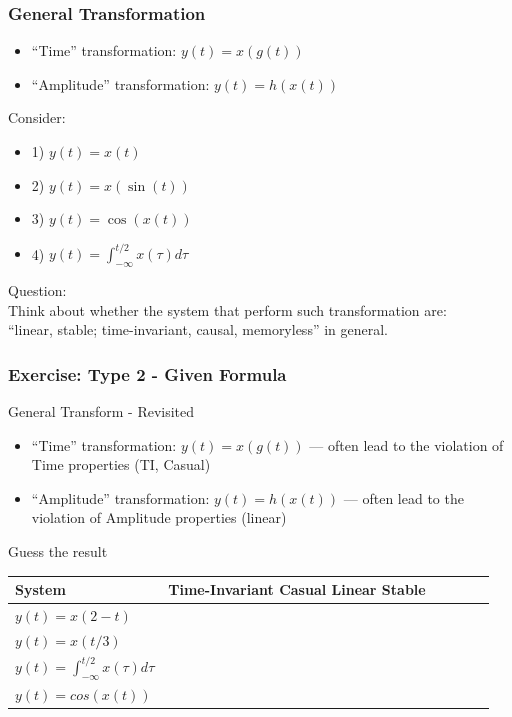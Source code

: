 \documentclass{beamer}
\begin{document}
\begin{frame}
    \frametitle{General Transformation}
    \begin{itemize}
    \item ``Time'' transformation: $ y(t) = x(g(t)) $ \\
    \item ``Amplitude'' transformation: $ y(t) = h(x(t)) $ \\
    \end{itemize}
Consider:
    \begin{itemize}
    \item 1) $y(t) = x(t) $
    \item  2) $y(t) = x(\sin(t))$   
    \item  3) $y(t) = \cos(x(t))$ 
    \item 4) $y(t)=\int_{-\infty}^{t/2}x(\tau)d\tau$               
    \end{itemize}
Question: \\
    \quad Think about whether the system that perform such transformation are: \\
    \quad ``linear, stable; time-invariant, causal, memoryless'' in general.  \\

\end{frame}



\begin{frame}
\frametitle{Exercise: Type 2 - Given Formula}
General Transform - Revisited
\begin{itemize}
    \item ``Time'' transformation: $ y(t) = x(g(t)) $ \newline --- often lead to the violation of Time properties (TI, Casual)\\
    \item ``Amplitude'' transformation: $ y(t) = h(x(t)) $ 
    \newline --- often lead to the violation of Amplitude properties (linear)\\
    \end{itemize}
\begin{block}{Guess the result}

\begin{table}
\begin{tabular}{l l l l l l }
\toprule
\textbf{System} & \textbf{Time-Invariant Casual Linear Stable} \\
\midrule
$y(t) = x(2 - t)$ & \\
$y(t) = x(t/3)$ & \\
$y(t) = \int_{-\infty}^{t/2}x(\tau)d\tau$ & \\
$y(t) = cos(x(t))$ & \\

\bottomrule
\end{tabular}
\end{table}

\end{block}
\end{frame}
\end{document}
